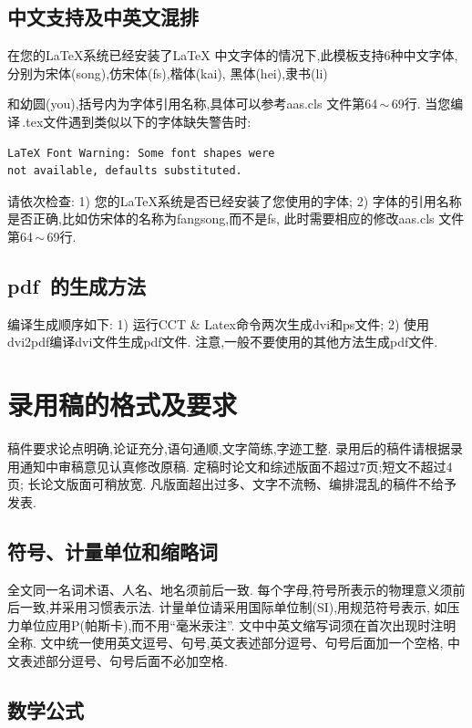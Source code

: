 \documentclass{aas}
\begin{document}
\subsection{中文支持及中英文混排}
在您的\LaTeX 系统已经安装了\LaTeX
中文字体的情况下,此模板支持6种中文字体,分别为宋体(song),仿宋体(fs),楷体(kai),
黑体(hei),隶书(li)
\onecolumn\begin{multicols}{2}%

\noindent 和幼圆(you),括号内为字体引用名称,具体可以参考aas.cls
文件第64\,$\sim$\,69行. 当您编译\,.tex文件遇到类似以下的字体缺失警告时:
\begin{verbatim}
LaTeX Font Warning: Some font shapes were
not available, defaults substituted.
\end{verbatim}
请依次检查: 1) 您的\LaTeX 系统是否已经安装了您使用的字体; 2)
字体的引用名称是否正确,比如仿宋体的名称为fangsong,而不是fs,
此时需要相应的修改aas.cls 文件第64\,$\sim$\,69行.


\subsection{{\bf pdf}~的生成方法}

编译生成顺序如下: 1) 运行CCT \&
Latex命令两次生成dvi和ps文件; 2) 使用dvi2pdf编译dvi文件生成pdf文件.
注意,一般不要使用的其他方法生成pdf文件.

\section{录用稿的格式及要求}

稿件要求论点明确,论证充分,语句通顺,文字简练,字迹工整.
录用后的稿件请根据录用通知中审稿意见认真修改原稿.
定稿时论文和综述版面不超过7页;短文不超过4页; 长论文版面可稍放宽.
凡版面超出过多、文字不流畅、编排混乱的稿件不给予发表.

\subsection{符号、计量单位和缩略词}

全文同一名词术语、人名、地名须前后一致.
每个字母,符号所表示的物理意义须前后一致,并采用习惯表示法.
计量单位请采用国际单位制(SI),用规范符号表示,
如压力单位应用P(帕斯卡),而不用``毫米汞注''.
文中中英文缩写词须在首次出现时注明全称.
文中统一使用英文逗号、句号,英文表述部分逗号、句号后面加一个空格,
中文表述部分逗号、句号后面不必加空格.

\subsection{数学公式}


\end{multicols}
\end{document}
